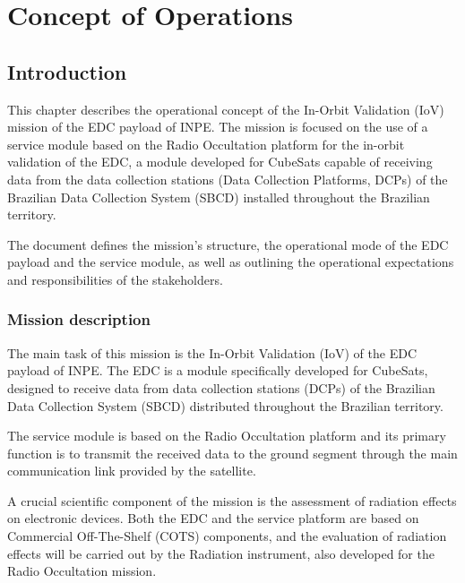 %
%
%
%
%

%
%
%
%
%

\chapter{Concept of Operations} \label{ch:conops}

\section{Introduction}

This chapter describes the operational concept of the In-Orbit Validation (IoV) mission of the EDC payload of INPE. The mission is focused on the use of a service module based on the Radio Occultation platform for the in-orbit validation of the EDC, a module developed for CubeSats capable of receiving data from the data collection stations (Data Collection Platforms, DCPs) of the Brazilian Data Collection System (SBCD) installed throughout the Brazilian territory.

The document defines the mission's structure, the operational mode of the EDC payload and the service module, as well as outlining the operational expectations and responsibilities of the stakeholders.

\subsection{Mission description}

The main task of this mission is the In-Orbit Validation (IoV) of the EDC payload of INPE. The EDC is a module specifically developed for CubeSats, designed to receive data from data collection stations (DCPs) of the Brazilian Data Collection System (SBCD) distributed throughout the Brazilian territory.

The service module is based on the Radio Occultation platform and its primary function is to transmit the received data to the ground segment through the main communication link provided by the satellite.

A crucial scientific component of the mission is the assessment of radiation effects on electronic devices. Both the EDC and the service platform are based on Commercial Off-The-Shelf (COTS) components, and the evaluation of radiation effects will be carried out by the Radiation instrument, also developed for the Radio Occultation mission.


